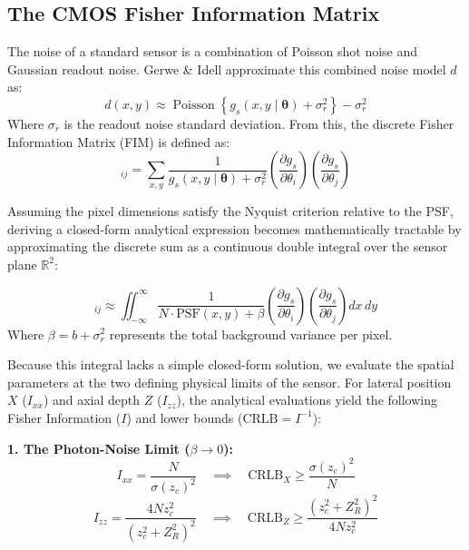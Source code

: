 \documentclass[11pt]{article}
\begin{document}
\subsection{The CMOS Fisher Information Matrix}
The noise of a standard sensor is a combination of Poisson shot noise and Gaussian readout noise. Gerwe \& Idell \cite{gerwe2003cramer} approximate this combined noise model $d$ as: 
\begin{equation}
d(x, y) \approx \operatorname{Poisson}\left\{ g_s(x, y \mid \bm{\theta}) + \sigma_r^2 \right\} - \sigma_r^2
\end{equation}
Where $\sigma_r$ is the readout noise standard deviation. From this, the discrete Fisher Information Matrix (FIM) is defined as:
\begin{equation}
[F(\bm{\theta})]_{ij} = \sum_{x,y} \frac{1}{g_s(x,y \mid \bm{\theta}) + \sigma_r^2} \left( \frac{\partial g_s}{\partial \theta_i} \right) \left( \frac{\partial g_s}{\partial \theta_j} \right)
\end{equation}

Assuming the pixel dimensions satisfy the Nyquist criterion relative to the PSF, deriving a closed-form analytical expression becomes mathematically tractable by approximating the discrete sum as a continuous double integral over the sensor plane $\mathbb{R}^2$:

\begin{equation}
[F(\bm{\theta})]_{ij} \approx \iint_{-\infty}^{\infty} \frac{1}{N \cdot \text{PSF}(x,y) + \beta} \left( \frac{\partial g_s}{\partial \theta_i} \right) \left( \frac{\partial g_s}{\partial \theta_j} \right) dx \, dy
\end{equation}
Where $\beta = b + \sigma_r^2$ represents the total background variance per pixel. 

Because this integral lacks a simple closed-form solution, we evaluate the spatial parameters at the two defining physical limits of the sensor. For lateral position $X$ ($I_{xx}$) and axial depth $Z$ ($I_{zz}$), the analytical evaluations yield the following Fisher Information ($I$) and lower bounds ($\text{CRLB} = I^{-1}$):

\vspace{0.5em}
\noindent \textbf{1. The Photon-Noise Limit ($\beta \to 0$):}
\begin{equation}
I_{xx} = \frac{N}{\sigma(z_c)^2} \quad \implies \quad \text{CRLB}_X \ge \frac{\sigma(z_c)^2}{N}
\end{equation}
\begin{equation}
I_{zz} = \frac{4 N z_c^2}{(z_c^2 + Z_R^2)^2} \quad \implies \quad \text{CRLB}_Z \ge \frac{(z_c^2 + Z_R^2)^2}{4 N z_c^2}
\end{equation}
\end{document}
